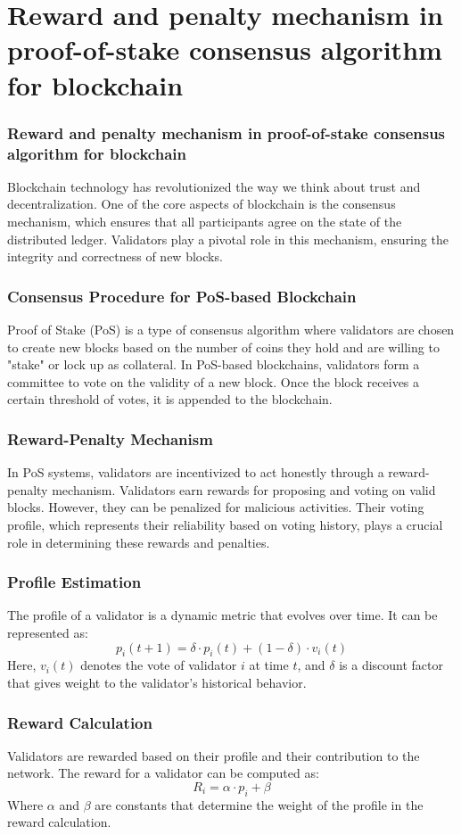 \documentclass{beamer}
\begin{document}
\section{Reward and penalty mechanism in proof-of-stake consensus algorithm for blockchain}


\begin{frame}
\frametitle{Reward and penalty mechanism in proof-of-stake consensus algorithm for blockchain \cite{reward2}}
Blockchain technology has revolutionized the way we think about trust and decentralization. One of the core aspects of blockchain is the consensus mechanism, which ensures that all participants agree on the state of the distributed ledger. Validators play a pivotal role in this mechanism, ensuring the integrity and correctness of new blocks.
\end{frame}

\begin{frame}
\frametitle{Consensus Procedure for PoS-based Blockchain}
Proof of Stake (PoS) is a type of consensus algorithm where validators are chosen to create new blocks based on the number of coins they hold and are willing to "stake" or lock up as collateral. In PoS-based blockchains, validators form a committee to vote on the validity of a new block. Once the block receives a certain threshold of votes, it is appended to the blockchain.
\end{frame}

\begin{frame}
\frametitle{Reward-Penalty Mechanism}
In PoS systems, validators are incentivized to act honestly through a reward-penalty mechanism. Validators earn rewards for proposing and voting on valid blocks. However, they can be penalized for malicious activities. Their voting profile, which represents their reliability based on voting history, plays a crucial role in determining these rewards and penalties.
\end{frame}

\begin{frame}
\frametitle{Profile Estimation}
The profile of a validator is a dynamic metric that evolves over time. It can be represented as:
\[ p_i(t+1) = \delta \cdot p_i(t) + (1-\delta) \cdot v_i(t) \]
Here, \( v_i(t) \) denotes the vote of validator \( i \) at time \( t \), and \( \delta \) is a discount factor that gives weight to the validator's historical behavior.
\end{frame}

\begin{frame}
\frametitle{Reward Calculation}
Validators are rewarded based on their profile and their contribution to the network. The reward for a validator can be computed as:
\[ R_i = \alpha \cdot p_i + \beta \]
Where \( \alpha \) and \( \beta \) are constants that determine the weight of the profile in the reward calculation.
\end{frame}
\end{document}
